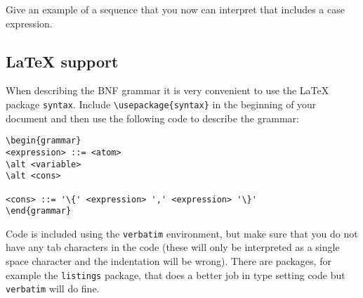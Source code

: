 \documentclass[a4paper,11pt]{article}
\begin{document}
Give an example of a sequence that you now can interpret that includes
a case expression.

\subsection{\LaTeX{} support}

When describing the BNF grammar it is very convenient to use the \LaTeX
package {\tt syntax}. Include \verb+\usepackage{syntax}+ in the
beginning of your document and then use the following code to describe
the grammar:

\begin{verbatim}
\begin{grammar}
<expression> ::= <atom>
\alt <variable>
\alt <cons> 

<cons> ::= '\{' <expression> ',' <expression> '\}'
\end{grammar}
\end{verbatim}

Code is included using the {\tt verbatim} environment, but make sure
that you do not have any tab characters in the code (these will only
be interpreted as a single space character and the indentation will be
wrong). There are packages, for example the {\tt listings} package,
that does a better job in type setting code but {\tt verbatim} will do
fine.
\end{document}
